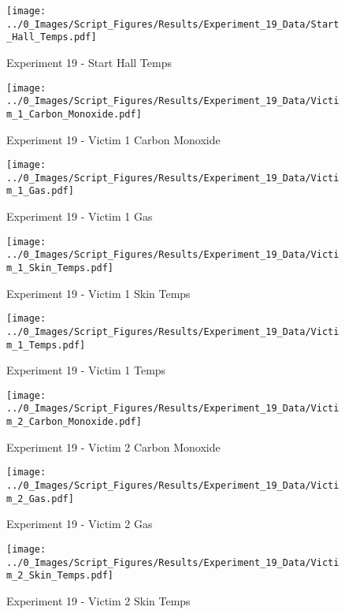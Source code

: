 	\begin{figure}[H]
		\centering
		\texttt{[image: ../0\_Images/Script\_Figures/Results/Experiment\_19\_Data/Start\_Hall\_Temps.pdf]}
		\caption[]{Experiment 19 - Start Hall Temps}
	\end{figure}
 
	\clearpage

	\begin{figure}[H]
		\centering
		\texttt{[image: ../0\_Images/Script\_Figures/Results/Experiment\_19\_Data/Victim\_1\_Carbon\_Monoxide.pdf]}
		\caption[]{Experiment 19 - Victim 1 Carbon Monoxide}
	\end{figure}
 

	\begin{figure}[H]
		\centering
		\texttt{[image: ../0\_Images/Script\_Figures/Results/Experiment\_19\_Data/Victim\_1\_Gas.pdf]}
		\caption[]{Experiment 19 - Victim 1 Gas}
	\end{figure}
 
	\clearpage

	\begin{figure}[H]
		\centering
		\texttt{[image: ../0\_Images/Script\_Figures/Results/Experiment\_19\_Data/Victim\_1\_Skin\_Temps.pdf]}
		\caption[]{Experiment 19 - Victim 1 Skin Temps}
	\end{figure}
 

	\begin{figure}[H]
		\centering
		\texttt{[image: ../0\_Images/Script\_Figures/Results/Experiment\_19\_Data/Victim\_1\_Temps.pdf]}
		\caption[]{Experiment 19 - Victim 1 Temps}
	\end{figure}
 
	\clearpage

	\begin{figure}[H]
		\centering
		\texttt{[image: ../0\_Images/Script\_Figures/Results/Experiment\_19\_Data/Victim\_2\_Carbon\_Monoxide.pdf]}
		\caption[]{Experiment 19 - Victim 2 Carbon Monoxide}
	\end{figure}
 

	\begin{figure}[H]
		\centering
		\texttt{[image: ../0\_Images/Script\_Figures/Results/Experiment\_19\_Data/Victim\_2\_Gas.pdf]}
		\caption[]{Experiment 19 - Victim 2 Gas}
	\end{figure}
 
	\clearpage

	\begin{figure}[H]
		\centering
		\texttt{[image: ../0\_Images/Script\_Figures/Results/Experiment\_19\_Data/Victim\_2\_Skin\_Temps.pdf]}
		\caption[]{Experiment 19 - Victim 2 Skin Temps}
	\end{figure}
 

